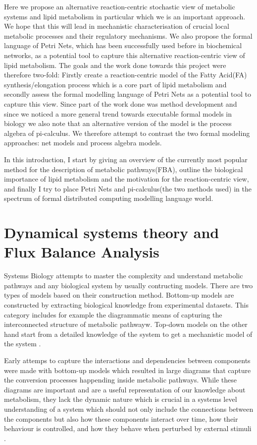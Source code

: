 Here we propose an alternative reaction-centric stochastic view of metabolic
systems and lipid metabolism in particular which we is an important
approach. We hope that this will lead in mechanistic
characterisation of crucial local metabolic processes and their
regulatory mechanisms. We also propose the formal language of Petri
Nets, which has been successfully used before in biochemical networks,
as a potential tool to capture this alternative reaction-centric view
of lipid metabolism. The goals and the work done towards this project were therefore two-fold:
Firstly create a reaction-centric model of the Fatty Acid(FA)
synthesis/elongation process which is a core part of lipid
metabolism and secondly assess the formal modelling language of Petri
Nets as a potential tool to capture this view. Since part of the work
done was method development and since we noticed a more
general trend towards executable formal models in biology \cite [] {fisher2007executable} we also
note that an alternative version of the model is the process
algebra of  pi-calculus. We therefore attempt to contrast the two formal
modeling approaches: net models and process algebra models.

In this introduction, I start by giving an overview of the currently most popular
method for the description of metabolic pathways(FBA),
outline the biological importance of lipid metabolism and the
motivation for the reaction-centric view, and finally I try to place
Petri Nets and pi-calculus(the two methods used) in the spectrum
of formal
distributed computing modelling language world.

\section{Dynamical systems theory and Flux Balance Analysis}
Systems Biology attempts to master the complexity and understand metabolic
pathways and any biological system by usually contructing
models. There are two types of models based on their construction
method. Bottom-up models are constructed by extracting biological
knowledge from experimental datasets. This category includes for
example the diagrammatic means of capturing the interconnected
structure of metabolic pathwayw. Top-down models on the other hand
start from a detailed knowledge of the system to get a mechanistic
model of the system \cite [] {schneider2013understanding}.

Early attemps to capture the interactions and dependencies between
components were made with bottom-up models which resulted in large diagrams that
capture the conversion processes happending inside metabolic pathways. While these
diagrams are important and are a useful representation of our knowledge
about metabolism, they lack the dynamic nature which is crucial in a
systems level understanding of a system which should not only include
the connections between the components but also how these components
interact over time, how their behaviour is
controlled, and how they behave when perturbed by external stimuli \cite [] {kitano2002systems}.

